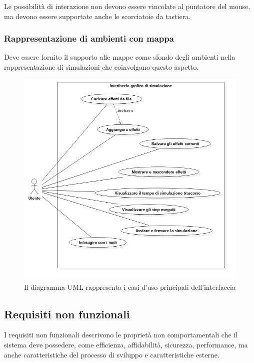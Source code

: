                 Le possibilità di interazione non devono essere vincolate al puntatore del mouse, ma devono essere supportate anche le scorciatoie da tastiera.

            \subsubsection{Rappresentazione di ambienti con mappa}\label{subsub:mappa}
                Deve essere fornito il supporto alle mappe come sfondo degli ambienti nella rappresentazione di simulazioni che coinvolgano questo aspetto.

            \begin{figure}[htbp]
                \centering
                \includegraphics[scale=0.65]{img/useCase}
                \caption{Il diagramma UML rappresenta i casi d'uso principali dell'interfaccia}
                \label{fig:useCase}
            \end{figure}

        \subsection{Requisiti non funzionali}\label{sub:nonFunzionali}
            I requisiti non funzionali descrivono le proprietà non comportamentali che il sistema deve possedere, come efficienza, affidabilità, sicurezza, performance, ma anche caratteristiche del processo di sviluppo e caratteristiche esterne.

